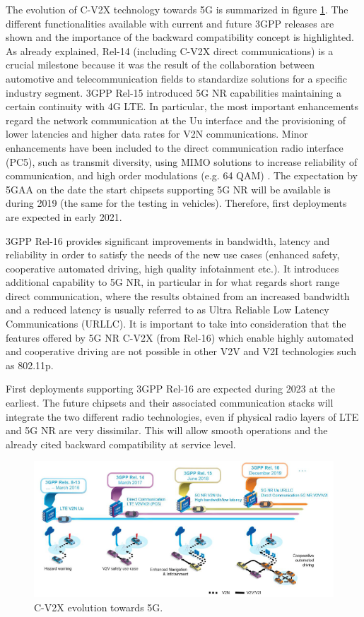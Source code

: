\documentclass[conference,12pt,onecolumn]{IEEEtran}
\begin{document}
The evolution of C-V2X technology towards 5G is summarized in figure \ref{fig:evolution}. The different functionalities available with current and future 3GPP releases are shown and the importance of the backward compatibility concept is highlighted. As already explained, Rel-14 (including C-V2X direct communications) is a crucial milestone because it was the result of the collaboration between automotive and telecommunication fields to standardize solutions for a specific industry segment. 3GPP Rel-15 introduced 5G NR capabilities maintaining a certain continuity with 4G LTE. In particular, the most important enhancements regard the network communication at the Uu interface and the provisioning of lower latencies and higher data rates for V2N communications. Minor enhancements have been included to the direct communication radio interface (PC5), such as transmit diversity, using MIMO solutions to increase reliability of communication, and high order modulations (e.g. 64 QAM) \cite{5GAAwhite}. The expectation by 5GAA on the date the start chipsets supporting 5G NR will be available is during 2019 (the same for the testing in vehicles). Therefore, first deployments are expected in early 2021. 

3GPP Rel-16 provides significant improvements in bandwidth, latency and reliability in order to satisfy the needs of the new use cases (enhanced safety, cooperative automated driving, high quality infotainment etc.). It introduces additional capability to 5G NR, in particular in for what regards short range direct communication, where the results obtained from an increased bandwidth and a reduced latency is usually referred to as Ultra Reliable Low Latency Communications (URLLC). It is important to take into consideration that the features offered by 5G NR C-V2X (from Rel-16) which enable highly automated and cooperative driving are not possible in other V2V and V2I technologies such as 802.11p. 

First deployments supporting 3GPP Rel-16 are expected during 2023 at the earliest. The future chipsets and their associated communication stacks will integrate the two different radio technologies, even if physical radio layers of LTE and 5G NR are very dissimilar. This will allow smooth operations and the already cited backward compatibility at service level.



\begin{figure}[ht]
   \centering
  \includegraphics[width=0.9\linewidth]{_Graphics/evolution_timeline.png}
  \caption{C-V2X evolution towards 5G. \cite{5GAAwhite}}
  \label{fig:evolution}
\end{figure}
\end{document}
